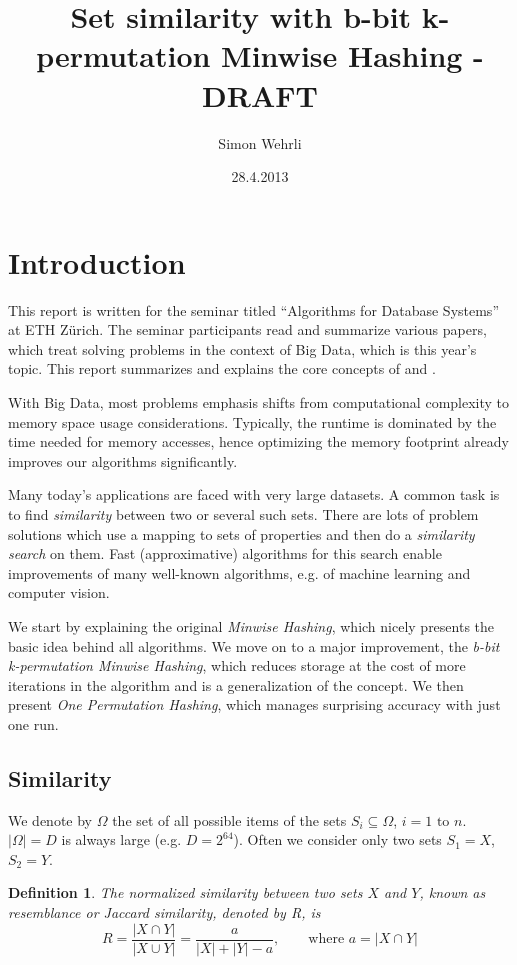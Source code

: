 \documentclass[a4paper]{article}
\author{Simon Wehrli}
\date{28.4.2013}
\title{Set similarity with b-bit k-permutation Minwise Hashing - DRAFT}
\newtheorem{mydef}{Definition}
\begin{document}
 
\maketitle

\section{Introduction}
This report is written for the seminar titled ``Algorithms for Database Systems'' at ETH Z\"{u}rich. The seminar participants read and summarize various papers, which treat solving problems in the context of Big Data, which is this year's topic. This report summarizes and explains the core concepts of \citep{LiK11} and \citep{LiOwZhang12}.

With Big Data, most problems emphasis shifts from computational complexity to memory space usage considerations. Typically, the runtime is dominated by the time needed for memory accesses, hence optimizing the memory footprint already improves our algorithms significantly. 

Many today's applications are faced with very large datasets. A common task is to find \emph{similarity} between two or several such sets. There are lots of problem solutions which use a mapping to sets of properties and then do a \emph{similarity search} on them. Fast (approximative) algorithms for this search enable improvements of many well-known algorithms, e.g. of machine learning and computer vision.

We start by explaining the original \emph{Minwise Hashing}, which nicely presents the basic idea behind all algorithms. We move on to a major improvement, the \emph{b-bit k-permutation Minwise Hashing}, which reduces storage at the cost of more iterations in the algorithm and is a generalization of the concept. We then present \emph{One Permutation Hashing}, which manages surprising accuracy with just one run.

\subsection{Similarity}
We denote by $\Omega$ the set of all possible items of the sets $S_i \subseteq \Omega$, $i = 1 \text{ to } n$. $\left| \Omega \right| = D$ is always large (e.g. $D=2^{64}$). Often we consider only two sets $S_1 = X$, $S_2 = Y$.
\begin{framed}
\begin{mydef}\label{def:jaccard}
The normalized similarity between two sets $X$ and $Y$, known as \emph{resemblance} or \emph{Jaccard similarity}, denoted by R, is
\begin{equation}
R=\frac{\left| X \cap Y \right|}{\left| X \cup Y \right|} = \frac{a}{\left| X \right| + \left| Y \right| -a}, \qquad \text{where } a=\left| X \cap Y \right|
\end{equation}
\end{mydef}
\end{framed}
\end{document}

